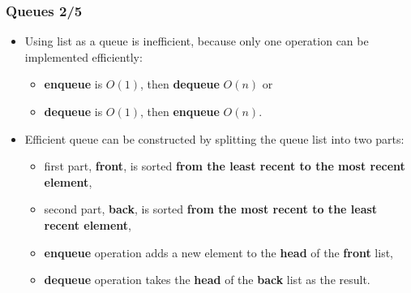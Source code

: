 \documentclass{beamer}
\begin{document}
\begin{frame}[fragile]
  \frametitle{Queues 2/5}
  \begin{itemize}
  \item Using list as a queue is inefficient, because only one operation can be
    implemented efficiently:
    \begin{itemize}
    \item \textbf{enqueue} is $O(1)$, then \textbf{dequeue} $O(n)$ or
    \item \textbf{dequeue} is $O(1)$, then \textbf{enqueue} $O(n)$.
    \end{itemize}
  \item Efficient queue can be constructed by splitting the queue list into two
    parts:
    \begin{itemize}
    \item first part, \textbf{front}, is sorted \textbf{from the least recent to
        the most recent element},
    \item second part, \textbf{back}, is sorted \textbf{from the most recent to
        the least recent element},
    \item \textbf{enqueue} operation adds a new element to the \textbf{head} of
      the \textbf{front} list,
    \item \textbf{dequeue} operation takes the \textbf{head} of the
      \textbf{back} list as the result.
    \end{itemize}
  \end{itemize}
\end{frame}
\end{document}
